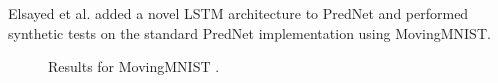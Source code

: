  Elsayed et al. \cite{Elsayed2018} added a novel LSTM architecture to PredNet and performed synthetic tests on the standard PredNet implementation
 using MovingMNIST.
 \begin{figure}[H]
   \centering
   \qquad
   \caption{Results for MovingMNIST \cite{Elsayed2018}.}
   \label{figure::elsayed_mnist}
  \end{figure}\noindent
 
